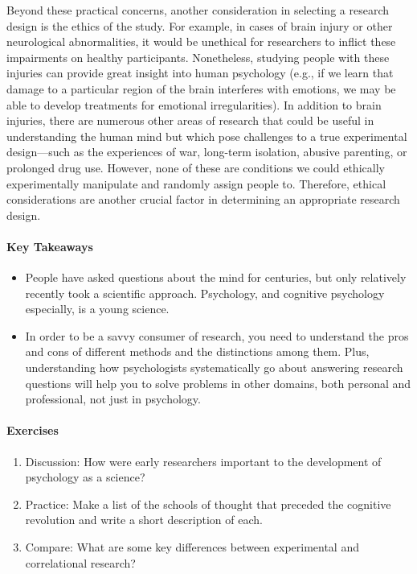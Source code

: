 \documentclass[
]{krantz}
\providecommand{\tightlist}{%
  \setlength{\itemsep}{0pt}\setlength{\parskip}{0pt}}
\begin{document}
Beyond these practical concerns, another consideration in selecting a research design is the ethics of the study. For example, in cases of brain injury or other neurological abnormalities, it would be unethical for researchers to inflict these impairments on healthy participants. Nonetheless, studying people with these injuries can provide great insight into human psychology (e.g., if we learn that damage to a particular region of the brain interferes with emotions, we may be able to develop treatments for emotional irregularities). In addition to brain injuries, there are numerous other areas of research that could be useful in understanding the human mind but which pose challenges to a true experimental design---such as the experiences of war, long-term isolation, abusive parenting, or prolonged drug use. However, none of these are conditions we could ethically experimentally manipulate and randomly assign people to. Therefore, ethical considerations are another crucial factor in determining an appropriate research design.

\hypertarget{key-takeaways}{%
\paragraph*{Key Takeaways}\label{key-takeaways}}

\begin{itemize}
\tightlist
\item
  People have asked questions about the mind for centuries, but only relatively recently took a scientific approach. Psychology, and cognitive psychology especially, is a young science.
\item
  In order to be a savvy consumer of research, you need to understand the pros and cons of different methods and the distinctions among them. Plus, understanding how psychologists systematically go about answering research questions will help you to solve problems in other domains, both personal and professional, not just in psychology.
\end{itemize}

\hypertarget{exercises}{%
\paragraph*{Exercises}\label{exercises}}

\begin{enumerate}
\def\labelenumi{\arabic{enumi}.}
\tightlist
\item
  Discussion: How were early researchers important to the development of psychology as a science?
\item
  Practice: Make a list of the schools of thought that preceded the cognitive revolution and write a short description of each.
\item
  Compare: What are some key differences between experimental and correlational research?
\end{enumerate}
\end{document}
